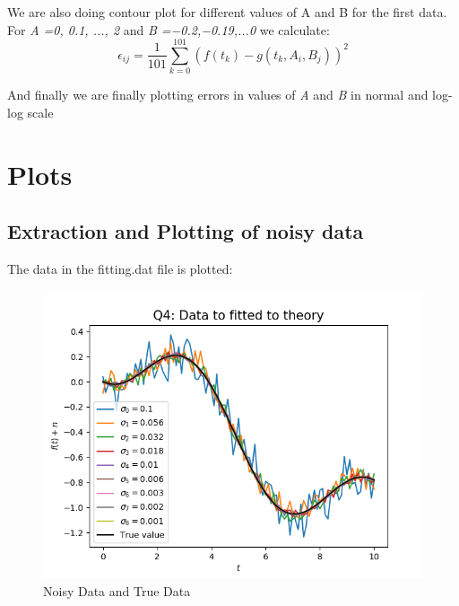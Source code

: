 \documentclass[11pt, a4paper]{article}
\begin{document}
        We are also doing contour plot for different values of A and B for the first data. For \textit{A =0, 0.1, ..., 2} and \textit{B =−0.2,−0.19,...0} we calculate:
        \begin{equation}
           \epsilon_{ij} = \frac{1}{101}\sum_{k=0}^{101}(f(t_k) - g(t_k, A_i, B_j))^2 
        \end{equation}

        And finally we are finally plotting errors in values of \textit{A} and \textit{B} in normal and log-log scale

    \section{Plots}
        \subsection{Extraction and Plotting of noisy data}
        
            The data in the fitting.dat file is plotted:
            
            \begin{figure}[H]
                \centering
                \includegraphics[scale=0.5]{q4_plot.png}
                \caption{Noisy Data and True Data}
                \label{fig:noisyAndTrue}
            \end{figure}
\end{document}
